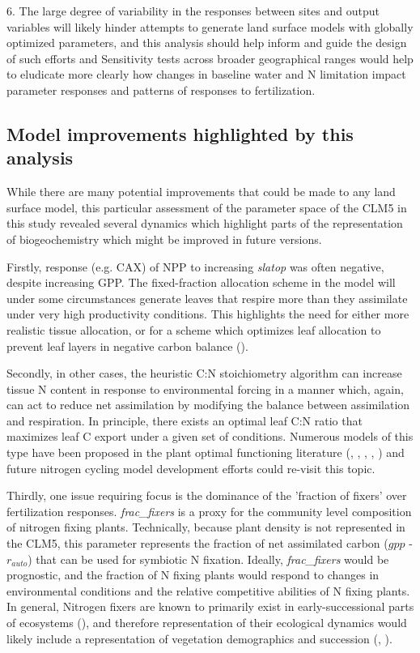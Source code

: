 \documentclass[draft,linenumbers]{agujournal}
\begin{document}
6. The large degree of variability in the responses between sites and output variables will likely hinder attempts to generate land surface models with globally optimized parameters, and this analysis should help inform and guide the design of such efforts and  Sensitivity tests across broader geographical ranges would help to eludicate more clearly how changes in baseline water and N limitation impact parameter responses and patterns of responses to fertilization.

\subsection{Model improvements highlighted by this analysis}
While there are many potential improvements that could be made to any land surface model, this particular assessment of the parameter space of the CLM5 in this study revealed several dynamics which highlight parts of the representation of biogeochemistry which might be improved in future versions.  

Firstly, response (e.g. CAX) of NPP to increasing \emph{slatop} was often negative, despite increasing GPP. The fixed-fraction allocation scheme in the model will under some circumstances generate leaves that respire more than they assimilate under very high productivity conditions. This highlights the need for either more realistic tissue allocation, or for a scheme which optimizes leaf allocation to prevent leaf layers in negative carbon balance (\cite{fisher2010}).  

Secondly, in other cases, the heuristic C:N stoichiometry algorithm can increase tissue N content in response to environmental forcing in a manner which, again, can act to reduce net assimilation by modifying the balance between assimilation and respiration. In principle, there exists an optimal leaf C:N ratio that maximizes leaf C export under a given set of conditions.  Numerous models of this type have been proposed in the plant optimal functioning literature (\cite{vanwijk2003}, \cite{mcmurtrie2011}, \cite{anten2011} \cite{franklin2012}, \cite{mcmurtrie2013}, \cite{thomas2014}) and future nitrogen cycling model development efforts could re-visit this topic.  

Thirdly, one issue requiring focus is the dominance of the 'fraction of fixers' over fertilization responses. \emph{frac\_fixers} is a proxy for the community level composition of nitrogen fixing plants. Technically, because plant density is not represented in the CLM5, this parameter represents the fraction of net assimilated carbon ($gpp$ - $r_{auto}$) that can be used for symbiotic N fixation. Ideally, \emph{frac\_fixers} would be prognostic, and the fraction of N fixing plants would respond to changes in environmental conditions and the relative competitive abilities of N fixing plants. In general, Nitrogen fixers are known to primarily exist in early-successional parts of ecosystems (\cite{vitousek1989}), and therefore representation of their ecological dynamics would likely include a representation of vegetation demographics and succession (\cite{fisher2018vegetation}, \cite{trugman2016climate}). 
\end{document}
